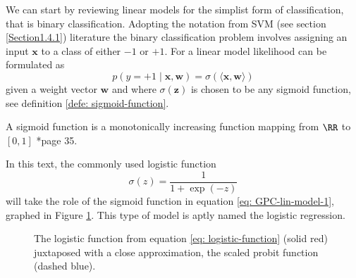 We can start by reviewing linear models for the simplist form of classification, that is binary classification. Adopting the notation from SVM (see section \ref{Section1.4.1}) literature the binary classification problem involves assigning an input $\bm{x}$ to a class of either $-1$ or $+1$. For a linear model likelihood can be formulated as
\begin{equation} \label{eq: GPC-lin-model-1}
    p \left( y=+1 \mid \bm{x} , \bm{w} \right) = \sigma \left( \langle \bm{x} , \bm{w} \rangle \right)
\end{equation}
given a weight vector $\bm{w}$ and where $\sigma (\bm{z})$ is chosen to be any sigmoid function, see definition \ref{defe: sigmoid-function}.
\begin{defe} \label{defe: sigmoid-function}
    A sigmoid function is a monotonically increasing function mapping from $\RR$ to $\left[ 0,1 \right]$ \cite{RasmussenCarlEdward2006Gpfm}*{page 35}.
\end{defe}
In this text, the commonly used logistic function
\begin{equation} \label{eq: logistic-function}
    \sigma (z) = \frac{1}{1 + \exp (-z)}
\end{equation}
will take the role of the sigmoid function in equation \ref{eq: GPC-lin-model-1}, graphed in Figure \ref{fig: logistic-func-and-probit}. This type of model is aptly named the logistic regression.
\begin{figure}[h]
    \centering
    \caption{The logistic function from equation \ref{eq: logistic-function} (solid red) juxtaposed with a close approximation, the scaled probit function (dashed blue).}
    \label{fig: logistic-func-and-probit}
\end{figure}

